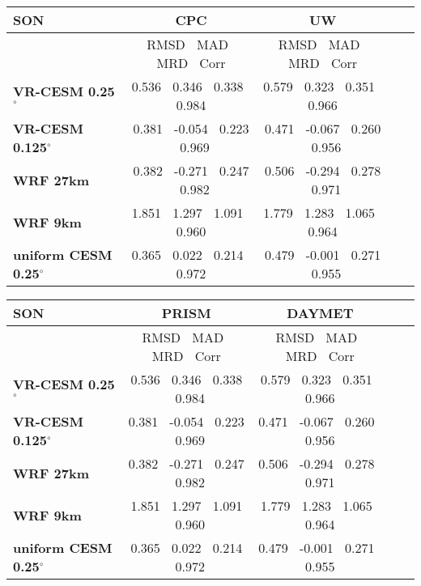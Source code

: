 \documentclass[ms]{agutexSI}
\begin{document}
\begin{table}
\begin{center}
\begin{tabular}{lcccc}
\hline \textbf{SON} & \textbf{CPC}  & \textbf{UW} \\
\hline $    $ & RMSD $\ $ MAD $\ $ MRD $\ $ Corr & RMSD $\ $ MAD $\ $ MRD $\ $ Corr \\
\hline \textbf{VR-CESM 0.25$^\circ$} & 0.536 $\ $ 0.346 $\ $ 0.338 $\ $ 0.984 & 0.579 $\ $ 0.323 $\ $ 0.351 $\ $ 0.966  \\
\textbf{VR-CESM 0.125$^\circ$} & 0.381 $\ $ -0.054 $\ $ 0.223 $\ $ 0.969 & 0.471 $\ $ -0.067 $\ $ 0.260 $\ $ 0.956 \\
\textbf{WRF 27km} & 0.382 $\ $ -0.271 $\ $ 0.247 $\ $ 0.982 & 0.506 $\ $ -0.294 $\ $ 0.278 $\ $ 0.971 \\
\textbf{WRF 9km} & 1.851 $\ $ 1.297 $\ $ 1.091 $\ $ 0.960 & 1.779 $\ $ 1.283 $\ $ 1.065 $\ $ 0.964 \\
\textbf{uniform CESM 0.25$^\circ$} & 0.365 $\ $ 0.022 $\ $ 0.214 $\ $ 0.972 & 0.479 $\ $ -0.001 $\ $ 0.271 $\ $ 0.955 \\
\hline
\end{tabular}

\begin{tabular}{lcccc}
\hline \textbf{SON} & \textbf{PRISM} & \textbf{DAYMET} \\
\hline $    $ & RMSD $\ $ MAD $\ $ MRD $\ $ Corr & RMSD $\ $ MAD $\ $ MRD $\ $ Corr \\
\hline \textbf{VR-CESM 0.25$^\circ$} & 0.536 $\ $ 0.346 $\ $ 0.338 $\ $ 0.984 & 0.579 $\ $ 0.323 $\ $ 0.351 $\ $ 0.966 \\
\textbf{VR-CESM 0.125$^\circ$} & 0.381 $\ $ -0.054 $\ $ 0.223 $\ $ 0.969 & 0.471 $\ $ -0.067 $\ $ 0.260 $\ $ 0.956 \\
\textbf{WRF 27km} & 0.382 $\ $ -0.271 $\ $ 0.247 $\ $ 0.982 & 0.506 $\ $ -0.294 $\ $ 0.278 $\ $ 0.971 \\
\textbf{WRF 9km} & 1.851 $\ $ 1.297 $\ $ 1.091 $\ $ 0.960 & 1.779 $\ $ 1.283 $\ $ 1.065 $\ $ 0.964 \\
\textbf{uniform CESM 0.25$^\circ$} & 0.365 $\ $ 0.022 $\ $ 0.214 $\ $ 0.972 & 0.479 $\ $ -0.001 $\ $ 0.271 $\ $ 0.955 \\
\hline
\end{tabular}

\end{center}
\end{table}
\end{document}
